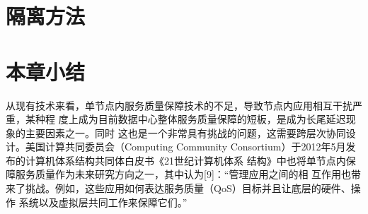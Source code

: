 \section{隔离方法}
\label{sec:multifig}


\section{本章小结}

从现有技术来看，单节点内服务质量保障技术的不足，导致节点内应用相互干扰严重，某种程
度上成为目前数据中心整体服务质量保障的短板，是成为长尾延迟现象的主要因素之一。同时
这也是一个非常具有挑战的问题，这需要跨层次协同设计。美国计算共同委员会（Computing 
Community Consortium）于2012年5月发布的计算机体系结构共同体白皮书《21世纪计算机体系
结构》中也将单节点内保障服务质量作为未来研究方向之一，其中认为[9]：“管理应用之间的相
互作用也带来了挑战。例如，这些应用如何表达服务质量（QoS）目标并且让底层的硬件、操作
系统以及虚拟层共同工作来保障它们。”

